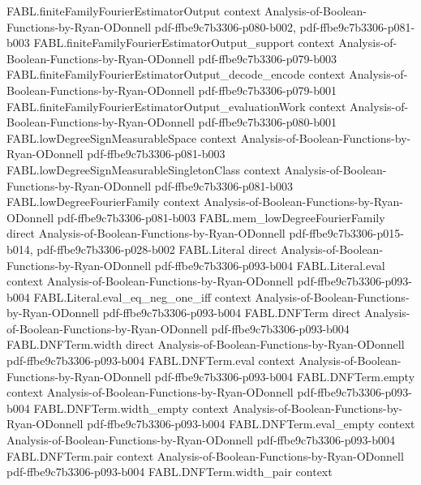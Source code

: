\begin{theorem}
\proofstep
  {FABL.finiteFamilyFourierEstimatorOutput}
  {context}
  {Analysis-of-Boolean-Functions-by-Ryan-ODonnell}
  {pdf-ffbe9c7b3306-p080-b002,
    pdf-ffbe9c7b3306-p081-b003}
\proofstep
  {FABL.finiteFamilyFourierEstimatorOutput_support}
  {context}
  {Analysis-of-Boolean-Functions-by-Ryan-ODonnell}
  {pdf-ffbe9c7b3306-p079-b003}
\proofstep
  {FABL.finiteFamilyFourierEstimatorOutput_decode_encode}
  {context}
  {Analysis-of-Boolean-Functions-by-Ryan-ODonnell}
  {pdf-ffbe9c7b3306-p079-b001}
\proofstep
  {FABL.finiteFamilyFourierEstimatorOutput_evaluationWork}
  {context}
  {Analysis-of-Boolean-Functions-by-Ryan-ODonnell}
  {pdf-ffbe9c7b3306-p080-b001}
\proofstep
  {FABL.lowDegreeSignMeasurableSpace}
  {context}
  {Analysis-of-Boolean-Functions-by-Ryan-ODonnell}
  {pdf-ffbe9c7b3306-p081-b003}
\proofstep
  {FABL.lowDegreeSignMeasurableSingletonClass}
  {context}
  {Analysis-of-Boolean-Functions-by-Ryan-ODonnell}
  {pdf-ffbe9c7b3306-p081-b003}
\proofstep
  {FABL.lowDegreeFourierFamily}
  {context}
  {Analysis-of-Boolean-Functions-by-Ryan-ODonnell}
  {pdf-ffbe9c7b3306-p081-b003}
\proofstep
  {FABL.mem_lowDegreeFourierFamily}
  {direct}
  {Analysis-of-Boolean-Functions-by-Ryan-ODonnell}
  {pdf-ffbe9c7b3306-p015-b014,
    pdf-ffbe9c7b3306-p028-b002}
\proofstep
  {FABL.Literal}
  {direct}
  {Analysis-of-Boolean-Functions-by-Ryan-ODonnell}
  {pdf-ffbe9c7b3306-p093-b004}
\proofstep
  {FABL.Literal.eval}
  {context}
  {Analysis-of-Boolean-Functions-by-Ryan-ODonnell}
  {pdf-ffbe9c7b3306-p093-b004}
\proofstep
  {FABL.Literal.eval_eq_neg_one_iff}
  {context}
  {Analysis-of-Boolean-Functions-by-Ryan-ODonnell}
  {pdf-ffbe9c7b3306-p093-b004}
\proofstep
  {FABL.DNFTerm}
  {direct}
  {Analysis-of-Boolean-Functions-by-Ryan-ODonnell}
  {pdf-ffbe9c7b3306-p093-b004}
\proofstep
  {FABL.DNFTerm.width}
  {direct}
  {Analysis-of-Boolean-Functions-by-Ryan-ODonnell}
  {pdf-ffbe9c7b3306-p093-b004}
\proofstep
  {FABL.DNFTerm.eval}
  {context}
  {Analysis-of-Boolean-Functions-by-Ryan-ODonnell}
  {pdf-ffbe9c7b3306-p093-b004}
\proofstep
  {FABL.DNFTerm.empty}
  {context}
  {Analysis-of-Boolean-Functions-by-Ryan-ODonnell}
  {pdf-ffbe9c7b3306-p093-b004}
\proofstep
  {FABL.DNFTerm.width_empty}
  {context}
  {Analysis-of-Boolean-Functions-by-Ryan-ODonnell}
  {pdf-ffbe9c7b3306-p093-b004}
\proofstep
  {FABL.DNFTerm.eval_empty}
  {context}
  {Analysis-of-Boolean-Functions-by-Ryan-ODonnell}
  {pdf-ffbe9c7b3306-p093-b004}
\proofstep
  {FABL.DNFTerm.pair}
  {context}
  {Analysis-of-Boolean-Functions-by-Ryan-ODonnell}
  {pdf-ffbe9c7b3306-p093-b004}
\proofstep
  {FABL.DNFTerm.width_pair}
  {context}

\end{theorem}
